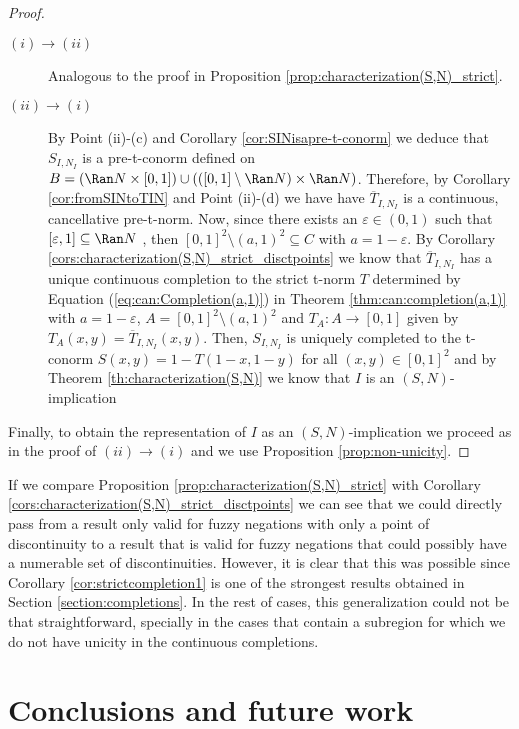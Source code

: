 \begin{proof}
	\begin{description}
	\item[$(i) \to (ii)$]  Analogous to the proof in Proposition \ref{prop:characterization(S,N)_strict}.
	\item[$(ii) \to (i)$] By Point (ii)-(c) and Corollary \ref{cor:SINisapre-t-conorm} we deduce that $S_{I,N_I}$ is a pre-t-conorm defined on $B=(\Ran N \times [0,1]) \cup (([0,1] \setminus \Ran N) \times \Ran N)$. Therefore, by Corollary \ref{cor:fromSINtoTIN} and Point (ii)-(d) we have have $\overline{T}_{I,N_I}$ is a continuous, cancellative pre-t-norm. Now, since there exists an $\varepsilon \in (0,1)$ such that $[\varepsilon,1] \subseteq \Ran N$ , then $[0,1]^2 \setminus (a,1)^2 \subseteq C$ with $a=1-\varepsilon$. By Corollary \ref{cors:characterization(S,N)_strict_disctpoints} we know that $\overline{T}_{I,N_I}$ has a unique continuous completion to the strict t-norm $T$ determined by Equation (\ref{eq:can:Completion(a,1)}) in Theorem \ref{thm:can:completion(a,1)} with $a=1-\varepsilon$, $A=[0,1]^2 \setminus (a,1)^2$ and $T_A : A \to [0,1]$ given by $T_A(x,y)=\overline{T}_{I,N_I}(x,y)$. Then, $S_{I,N_I}$ is uniquely completed to the t-conorm $S(x,y)=1-T(1-x,1-y)$ for all $(x,y) \in [0,1]^2$ and by Theorem \ref{th:characterization(S,N)} we know that $I$ is an $(S,N)$-implication
	\end{description}
Finally, to obtain the representation of $I$ as an $(S,N)$-implication we proceed as in the proof of $(ii) \to (i)$ and we use Proposition \ref{prop:non-unicity}.
\end{proof}

If we compare Proposition \ref{prop:characterization(S,N)_strict} with Corollary \ref{cors:characterization(S,N)_strict_disctpoints} we can see that we could directly pass from a result only valid for fuzzy negations with only a point of discontinuity to a result that is valid for fuzzy negations that could possibly have a numerable set of discontinuities. However, it is clear that this was possible since Corollary \ref{cor:strictcompletion1} is one of the strongest results obtained in Section \ref{section:completions}. In the rest of cases, this generalization could not be that straightforward, specially in the cases that contain a subregion for which we do not have unicity in the continuous completions.

\section{Conclusions and future work}\label{section:sn:conclusions}

